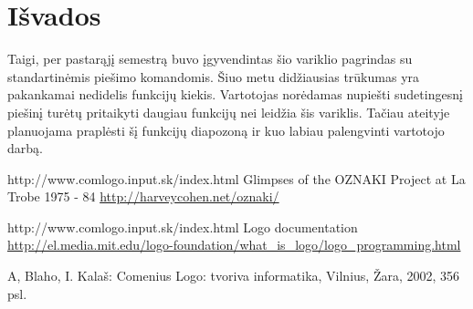 \documentclass[a4paper,12pt]{article}
\begin{document}
\newpage

\section*{Išvados}


Taigi, per pastarąjį semestrą buvo įgyvendintas šio variklio pagrindas su standartinėmis piešimo komandomis. Šiuo metu didžiausias trūkumas yra pakankamai nedidelis funkcijų kiekis. Vartotojas norėdamas nupiešti sudetingesnį piešinį turėtų pritaikyti daugiau funkcijų nei leidžia šis variklis. Tačiau ateityje planuojama praplėsti šį funkcijų diapozoną ir kuo labiau palengvinti vartotojo darbą. \\

\renewcommand {\refname}{Literatūra}

\begin{thebibliography}{9}





http://www.comlogo.input.sk/index.html 
Glimpses of the OZNAKI Project at La Trobe 1975 - 84
\url {http://harveycohen.net/oznaki/}

http://www.comlogo.input.sk/index.html 
Logo documentation
\url {http://el.media.mit.edu/logo-foundation/what_is_logo/logo_programming.html}

A, Blaho, I. Kalaš: Comenius Logo: tvoriva informatika, Vilnius, Žara, 2002, 356 psl.
\end{thebibliography}
\end{document}

